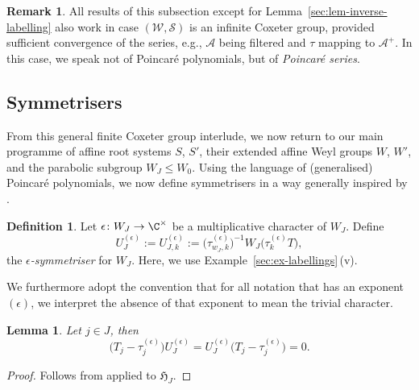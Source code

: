 \documentclass[pdftex]{sigma}
\newtheorem{Lemma}[Theorem]{Lemma}
\theoremstyle{definition}
\newtheorem{Definition}[Theorem]{Definition}
\newtheorem{Remark}[Theorem]{Remark}
\numberwithin{equation}{section}
\begin{document}
\begin{Remark}
 All results of this subsection except for Lemma~\ref{sec:lem-inverse-labelling} also work in case $(\mathcal{W},\mathcal{S})$ is an infinite
 Coxeter group, provided sufficient convergence of the series, e.g., $\mathcal{A}$ being filtered and $\tau$ mapping to $\mathcal{A}^+$.
 In this case, we speak not of Poincar\'e polynomials, but of \emph{Poincar\'e series}.
\end{Remark}

\subsection{Symmetrisers}
From this general finite Coxeter group interlude, we now return to our
main programme of affine root systems $S$, $S'$, their extended affine Weyl
groups $W$, $W'$, and the parabolic subgroup ${W_J\le W_0}$. Using the
language of (generalised) Poincar\'e polynomials, we now define symmetrisers
in a way generally inspired by \cite[Section~5.5]{macdonald}.

\begin{Definition}
 Let $\epsilon\colon W_J\to\C^\times$ be a multiplicative character of $W_J$.
 Define
 \[
 U^{(\epsilon)}_J := U^{(\epsilon)}_{J,k} := \bigl(\tau^{(\epsilon)}_{w_J,k}\bigr)^{-1} W_J\bigl(\tau^{(\epsilon)}_k T\bigr),
 \]
 the \emph{$\epsilon$-symmetriser} for $W_J$. Here, we use Example~\ref{sec:ex-labellings}\,(v).
\end{Definition}
We furthermore adopt the convention that for all notation that has an exponent $(\epsilon)$, we interpret the absence of that exponent to mean
the trivial character.

\begin{Lemma}\label{sec:lem-symmetriser-symmetric}
 Let $j\in J$, then
 \[
 \bigl(T_j-\tau^{(\epsilon)}_j\bigr)U^{(\epsilon)}_J =
 U^{(\epsilon)}_J \bigl(T_j-\tau^{(\epsilon)}_j\bigr) = 0.
 \]
\end{Lemma}
\begin{proof}
 Follows from \cite[Section~5.5.9]{macdonald} applied to $\mathfrak{H}_J$.
\end{proof}
\end{document}
